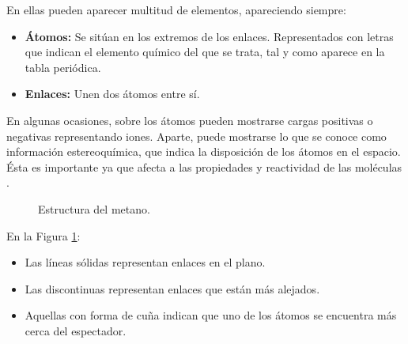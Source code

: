 \noindent En ellas pueden aparecer multitud de elementos, apareciendo siempre:
\begin{itemize}
    \item \textbf{Átomos:} Se sitúan en los extremos de los enlaces. Representados con letras que indican el elemento químico del que se trata, tal y como aparece en la tabla periódica.
    \item \textbf{Enlaces:} Unen dos átomos entre sí. 
\end{itemize}

En algunas ocasiones, sobre los átomos pueden mostrarse cargas positivas o negativas representando iones. Aparte, puede mostrarse lo que se conoce como información estereoquímica, que indica la disposición de los átomos en el espacio. Ésta es importante ya que afecta a las propiedades y reactividad de las moléculas \cite{wade2004quimica,structrep}.

\begin{figure}[H]
\centering
    \caption{Estructura del metano. \cite{structrep}} 
    \label{fig:metano}
\end{figure}

En la Figura \ref{fig:metano}:
\begin{itemize}
    \item Las líneas sólidas representan enlaces en el plano.
    \item Las discontinuas representan enlaces que están más alejados.
    \item Aquellas con forma de cuña indican que uno de los átomos se encuentra más cerca del espectador. 
\end{itemize}

